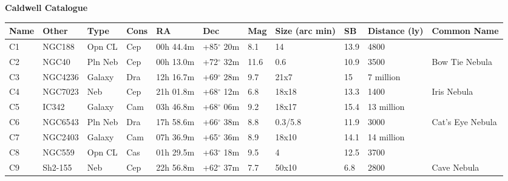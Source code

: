\documentclass[10pt,twoside,a4paper,english]{article}
\begin{document}
 
 
 
 
 
 
\clearpage 
\hspace{6 mm} 
{\bf Caldwell Catalogue}  
\begin{longtable}{@{}lllllllllll@{}} 
\hline 
{\bf Name} & {\bf Other} & {\bf Type} & {\bf Cons} & {\bf RA}  & {\bf Dec} & {\bf Mag} & {\bf Size (arc min)} & {\bf SB} & {\bf Distance (ly)} & {\bf Common Name}               \\ 
\hline 
C1         & NGC188      & Opn CL     & Cep       & 00h 44.4m & +85$^{\circ}$ 20m  & 8.1       & 14                   & 13.9     & 4800                &                                 \\ 
C2         & NGC40       & Pln Neb    & Cep       & 00h 13.0m & +72$^{\circ}$ 32m  & 11.6      & 0.6                  & 10.9     & 3500                & Bow Tie Nebula                  \\ 
C3         & NGC4236     & Galaxy     & Dra       & 12h 16.7m & +69$^{\circ}$ 28m  & 9.7       & 21x7                 & 15       & 7 million           &                                 \\ 
C4         & NGC7023     & Neb        & Cep       & 21h 01.8m & +68$^{\circ}$ 12m  & 6.8       & 18x18                & 13.3     & 1400                & Iris Nebula                     \\ 
C5         & IC342       & Galaxy     & Cam       & 03h 46.8m & +68$^{\circ}$ 06m  & 9.2       & 18x17                & 15.4     & 13 million          &                                 \\ 
C6         & NGC6543     & Pln Neb    & Dra       & 17h 58.6m & +66$^{\circ}$ 38m  & 8.8       & 0.3/5.8              & 11.9     & 3000                & Cat's Eye Nebula                \\ 
C7         & NGC2403     & Galaxy     & Cam       & 07h 36.9m & +65$^{\circ}$ 36m  & 8.9       & 18x10                & 14.1     & 14 million          &                                 \\ 
C8         & NGC559      & Opn CL     & Cas       & 01h 29.5m & +63$^{\circ}$ 18m  & 9.5       & 4                    & 12.5     & 3700                &                                 \\ 
C9         & Sh2-155     & Neb        & Cep       & 22h 56.8m & +62$^{\circ}$ 37m  & 7.7       & 50x10                & 6.8      & 2800                & Cave Nebula                     \\ 

\end{longtable}
\end{document}
